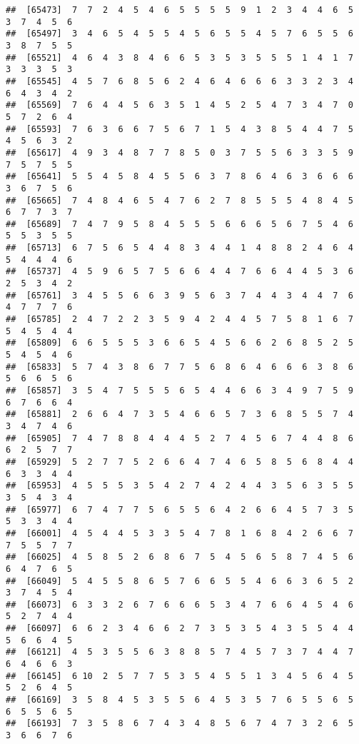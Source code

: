 \documentclass[
]{book}
\begin{document}
\begin{verbatim}
##  [65473]  7  7  2  4  5  4  6  5  5  5  5  9  1  2  3  4  4  6  5  3  7  4  5  6
##  [65497]  3  4  6  5  4  5  5  4  5  6  5  5  4  5  7  6  5  5  6  3  8  7  5  5
##  [65521]  4  6  4  3  8  4  6  6  5  3  5  3  5  5  5  1  4  1  7  3  3  3  5  3
##  [65545]  4  5  7  6  8  5  6  2  4  6  4  6  6  6  3  3  2  3  4  6  4  3  4  2
##  [65569]  7  6  4  4  5  6  3  5  1  4  5  2  5  4  7  3  4  7  0  5  7  2  6  4
##  [65593]  7  6  3  6  6  7  5  6  7  1  5  4  3  8  5  4  4  7  5  4  5  6  3  2
##  [65617]  4  9  3  4  8  7  7  8  5  0  3  7  5  5  6  3  3  5  9  7  5  7  5  5
##  [65641]  5  5  4  5  8  4  5  5  6  3  7  8  6  4  6  3  6  6  6  3  6  7  5  6
##  [65665]  7  4  8  4  6  5  4  7  6  2  7  8  5  5  5  4  8  4  5  6  7  7  3  7
##  [65689]  7  4  7  9  5  8  4  5  5  5  6  6  6  5  6  7  5  4  6  5  5  3  5  5
##  [65713]  6  7  5  6  5  4  4  8  3  4  4  1  4  8  8  2  4  6  4  5  4  4  4  6
##  [65737]  4  5  9  6  5  7  5  6  6  4  4  7  6  6  4  4  5  3  6  2  5  3  4  2
##  [65761]  3  4  5  5  6  6  3  9  5  6  3  7  4  4  3  4  4  7  6  4  7  7  7  6
##  [65785]  2  4  7  2  2  3  5  9  4  2  4  4  5  7  5  8  1  6  7  5  4  5  4  4
##  [65809]  6  6  5  5  5  3  6  6  5  4  5  6  6  2  6  8  5  2  5  5  4  5  4  6
##  [65833]  5  7  4  3  8  6  7  7  5  6  8  6  4  6  6  6  3  8  6  5  6  6  5  6
##  [65857]  3  5  4  7  5  5  5  6  5  4  4  6  6  3  4  9  7  5  9  6  7  6  6  4
##  [65881]  2  6  6  4  7  3  5  4  6  6  5  7  3  6  8  5  5  7  4  3  4  7  4  6
##  [65905]  7  4  7  8  8  4  4  4  5  2  7  4  5  6  7  4  4  8  6  6  2  5  7  7
##  [65929]  5  2  7  7  5  2  6  6  4  7  4  6  5  8  5  6  8  4  4  6  3  3  4  4
##  [65953]  4  5  5  5  3  5  4  2  7  4  2  4  4  3  5  6  3  5  5  3  5  4  3  4
##  [65977]  6  7  4  7  7  5  6  5  5  6  4  2  6  6  4  5  7  3  5  5  3  3  4  4
##  [66001]  4  5  4  4  5  3  3  5  4  7  8  1  6  8  4  2  6  6  7  7  5  5  7  7
##  [66025]  4  5  8  5  2  6  8  6  7  5  4  5  6  5  8  7  4  5  6  6  4  7  6  5
##  [66049]  5  4  5  5  8  6  5  7  6  6  5  5  4  6  6  3  6  5  2  3  7  4  5  4
##  [66073]  6  3  3  2  6  7  6  6  6  5  3  4  7  6  6  4  5  4  6  5  2  7  4  4
##  [66097]  6  6  2  3  4  6  6  2  7  3  5  3  5  4  3  5  5  4  4  5  6  6  4  5
##  [66121]  4  5  3  5  5  6  3  8  8  5  7  4  5  7  3  7  4  4  7  6  4  6  6  3
##  [66145]  6 10  2  5  7  7  5  3  5  4  5  5  1  3  4  5  6  4  5  5  2  6  4  5
##  [66169]  3  5  8  4  5  3  5  5  6  4  5  3  5  7  6  5  5  6  5  6  5  5  6  5
##  [66193]  7  3  5  8  6  7  4  3  4  8  5  6  7  4  7  3  2  6  5  3  6  6  7  6

\end{verbatim}
\end{document}
